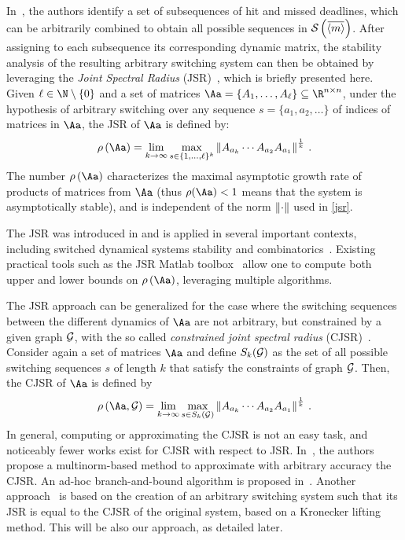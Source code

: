 In~\cite{Maggio:2020}, the authors identify a set of subsequences of hit and missed deadlines, which can be arbitrarily combined to obtain all possible sequences in $\sset{}{\overbar{\left<m\right>}}$.
After assigning to each subsequence its corresponding dynamic matrix, the stability analysis of the resulting arbitrary switching system can then be obtained by leveraging the \emph{Joint Spectral Radius} (JSR)~\cite{Jungers2009}, which is briefly presented here.
%
Given $\ell\in\N\setminus \left\{ 0 \right\} $ and a set of matrices $\Aa = \{A_1, \ldots, A_\ell \} \subseteq \R^{n\times n}$, under the hypothesis of arbitrary switching over any sequence $s=\{a_1,a_2,\dots\}$ of indices of matrices in $\Aa$, the JSR of $\Aa$ is defined by:
\begin{equation}
    \label{jsr}
    \rho\left(\Aa\right)= \lim_{k\rightarrow\infty} \max_{s\in\{1,\ldots,\ell\}^k} \norm{A_{a_k} \cdots A_{a_2}A_{a_1}}^{\frac{1}{k}} \,.
\end{equation}
The number $\rho\left(\Aa\right)$ characterizes the maximal asymptotic growth rate of products of matrices from $\Aa$ (thus  $\rho(\Aa)<1$ means that the system is asymptotically stable), and is independent of the norm $\left\lVert\cdot\right\rVert$ used in \eqref{jsr}.

The JSR was introduced in \cite{rota} and is applied in several important contexts, including switched dynamical systems stability and combinatorics~\cite{Jungers2009}.
Existing practical tools such as the JSR Matlab toolbox~\cite{vankeerberghen2014jsr} allow one to compute both upper and lower bounds on $\rho\left(\Aa\right)$, leveraging multiple algorithms.

The JSR approach can be generalized for the case where the switching sequences between the different dynamics of $\Aa$ are not arbitrary, but constrained by a given graph $\mathcal{G}_{}$, with the so called \emph{constrained joint spectral radius} (CJSR)~\cite{dai2012gelfand}.
Consider again a set of matrices $\Aa$ and define ${S}_k(\mathcal{G}_{})$ as the set of all possible switching sequences $s$ of length $k$ that satisfy the constraints of graph $\mathcal{G}_{}$.
Then, the CJSR of $\Aa$ is defined by
\begin{equation}
\label{cjsr}
    \rho\left(\Aa,\GG{}\right)= \lim_{k\rightarrow\infty} \max_{s\in{S}_k(\GG{})} \norm{A_{a_k} \cdots A_{a_2}A_{a_1}}^{\frac{1}{k}} \,.
\end{equation}
In general, computing or approximating the CJSR is not an easy task, and noticeably fewer works exist for CJSR with respect to JSR.
In~\cite{philippe2016stability}, the authors propose a multinorm-based method to approximate with arbitrary accuracy the CJSR.
An ad-hoc branch-and-bound algorithm is proposed in~\cite{dercole2017simple}.
Another approach~\cite{kozyakin2014berger, wang2014stability, xu2020approximation} is based on the creation of an arbitrary switching system such that its JSR is equal to the CJSR of the original system, based on a Kronecker lifting method.
This will be also our approach, as detailed later.

